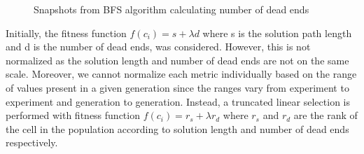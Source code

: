 \begin{figure}[!h]
\centering
            \hfill
            \hfill
            \hfill
            \hfill
            \caption{Snapshots from BFS algorithm calculating number of dead ends}
\label{fig:dead-ends}
\end{figure}

Initially, the fitness function $f(c_i) = s + \lambda d$ where s is the solution path length and d is the number of dead ends, was considered. However, this is not normalized as the solution length and number of dead ends are not on the same scale. Moreover, we cannot normalize each metric individually based on the range of values present in a given generation since the ranges vary from experiment to experiment and generation to generation. Instead, a truncated linear selection is performed with fitness function $f(c_i) = r_s + \lambda r_d$ where $r_s$ and $r_d$ are the rank of the cell in the population according to solution length and number of dead ends respectively.
